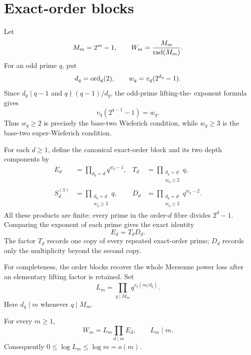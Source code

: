 
\section{Exact-order blocks}
\label{sec:blocks}

Let
\[
  M_m=2^m-1,
  \qquad
  W_m=\frac{M_m}{\operatorname{rad}(M_m)}.
\]
For an odd prime $q$, put
\begin{equation}
  d_q=\operatorname{ord}_q(2),
  \qquad
  w_q=v_q(2^{d_q}-1).
  \label{eq:canonical-data}
\end{equation}
Since $d_q\mid q-1$ and $q\nmid(q-1)/d_q$, the odd-prime lifting-the-
exponent formula gives
\begin{equation}
  v_q(2^{q-1}-1)=w_q.
  \label{eq:fermat-depth}
\end{equation}
Thus $w_q\ge2$ is precisely the base-two Wieferich condition, while
$w_q\ge3$ is the base-two super-Wieferich condition.

For each $d\ge1$, define the canonical exact-order block and its two depth
components by
\begin{align}
 E_d&=\prod_{d_q=d}q^{w_q-1},
 &T_d&=\prod_{\substack{d_q=d\\w_q\ge2}}q,
 \label{eq:E-T}\\
 S_d^{(3)}&=\prod_{\substack{d_q=d\\w_q\ge3}}q,
 &D_d&=\prod_{\substack{d_q=d\\w_q\ge3}}q^{w_q-2}.
 \label{eq:S-D}
\end{align}
All these products are finite: every prime in the order-$d$ fibre divides
$2^d-1$.  Comparing the exponent of each prime gives the exact identity
\begin{equation}
                         E_d=T_dD_d.
  \label{eq:E-split}
\end{equation}
The factor $T_d$ records one copy of every repeated exact-order prime;
$D_d$ records only the multiplicity beyond the second copy.

For completeness, the order blocks recover the whole Mersenne power loss
after an elementary lifting factor is retained.  Set
\begin{equation}
  L_m=\prod_{q\mid M_m}q^{v_q(m/d_q)}.
  \label{eq:lifting-factor}
\end{equation}
Here $d_q\mid m$ whenever $q\mid M_m$.

\begin{proposition}
\label{prop:ledger}
For every $m\ge1$,
\begin{equation}
  W_m=L_m\prod_{d\mid m}E_d,
  \qquad L_m\mid m.
  \label{eq:exact-ledger}
\end{equation}
Consequently $0\le\log L_m\le\log m=o(m)$.
\end{proposition}

